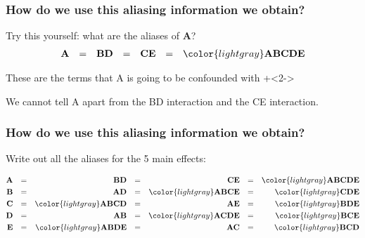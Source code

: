 \documentclass[handout,11pt,aspectratio=169,mathserif]{beamer}
\begin{document}
\begin{frame}\frametitle{How do we use this aliasing information we obtain?}
	Try this yourself: what are the aliases of \textbf{A}?
	\pause
	\begin{align*}
		\textbf{A} &&=&& \textbf{BD} &&=&& \textbf{CE} &&=&&\color{lightgray} \textbf{ABCDE}
	\end{align*}
		
	\vspace{1cm}
	\begin{itemize}
		\item	These are the terms that A is going to be confounded with
		\onslide+<2->{\item	We cannot tell A apart from the BD interaction and the CE interaction.}
	\end{itemize}
\end{frame}

\begin{frame}\frametitle{How do we use this aliasing information we obtain?}
	
	\vspace{1cm}
	Write out all the aliases for the 5 main effects:
	
	\vspace{0.5cm}
	\begin{align*}
		\textbf{A} &&=&& \textbf{BD} &&=&& \textbf{CE} &&=&&\color{lightgray} \textbf{ABCDE}\\
		\textbf{B} &&=&& \textbf{AD} &&=&& {\color{lightgray}\textbf{ABCE}} &&=&& \color{lightgray} \textbf{CDE}\\
		\textbf{C} &&=&& \color{lightgray}\textbf{ABCD} &&=&& \textbf{AE} &&=&&\color{lightgray} \textbf{BDE}\\
		\textbf{D} &&=&& \textbf{AB} &&=&& \color{lightgray} \textbf{ACDE} &&=&& \color{lightgray}\textbf{BCE} \\
		\textbf{E} &&=&& \color{lightgray} \textbf{ABDE} &&=&& \textbf{AC} &&=&&\color{lightgray} \textbf{BCD}\\
	\end{align*}
	
\end{frame}
\end{document}
